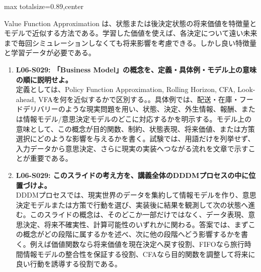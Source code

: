 \begin{minipage}[t]{0.58\textwidth}
\begin{adjustbox}{max totalsize={\textwidth}{0.89\textheight},center}
\begin{minipage}{\textwidth}
Value Function Approximation は、状態または後決定状態の将来価値を特徴量とモデルで近似する方法である。学習した価値を使えば、各決定について遠い未来まで毎回シミュレーションしなくても将来影響を考慮できる。しかし良い特徴量と学習データが必要である。\par{}\begin{enumerate}\item \textbf{L06-S029: 「Business Model」の概念を、定義・具体例・モデル上の意味の順に説明せよ。}\\定義としては、Policy Function Approximation, Rolling Horizon, CFA, Look-ahead, VFAを何を近似するかで区別する。。具体例では、配送・在庫・フードデリバリーのような現実問題を用い、状態、決定、外生情報、報酬、または情報モデル/意思決定モデルのどこに対応するかを明示する。モデル上の意味として、この概念が目的関数、制約、状態表現、将来価値、または方策選択にどのような影響を与えるかを書く。試験では、用語だけを列挙せず、入力データから意思決定、さらに現実の実装へつながる流れを文章で示すことが重要である。\item \textbf{L06-S029: このスライドの考え方を、講義全体のDDDMプロセスの中に位置づけよ。}\\DDDMプロセスでは、現実世界のデータを集約して情報モデルを作り、意思決定モデルまたは方策で行動を選び、実装後に結果を観測して次の状態へ進む。このスライドの概念は、そのどこか一部だけではなく、データ表現、意思決定、将来不確実性、計算可能性のいずれかに関わる。答案では、まずこの概念がどの段階に属するかを述べ、次に他の段階へどう影響するかを書く。例えば価値関数なら将来価値を現在決定へ戻す役割、FIFOなら旅行時間情報モデルの整合性を保証する役割、CFAなら目的関数を調整して将来に良い行動を誘導する役割である。\end{enumerate}
\end{minipage}
\end{adjustbox}
\end{minipage}


